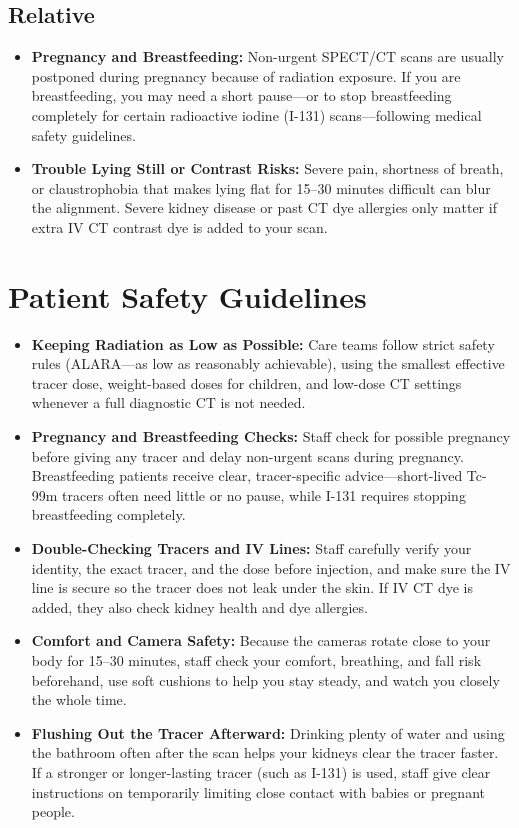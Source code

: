 \subsection{Relative}
\begin{itemize}
    \item \textbf{Pregnancy and Breastfeeding:} Non-urgent SPECT/CT scans are usually postponed during pregnancy because of radiation exposure. If you are breastfeeding, you may need a short pause---or to stop breastfeeding completely for certain radioactive iodine (I-131) scans---following medical safety guidelines.
    \item \textbf{Trouble Lying Still or Contrast Risks:} Severe pain, shortness of breath, or claustrophobia that makes lying flat for 15--30 minutes difficult can blur the alignment. Severe kidney disease or past CT dye allergies only matter if extra IV CT contrast dye is added to your scan.
\end{itemize}

\section{Patient Safety Guidelines}
\begin{itemize}
    \item \textbf{Keeping Radiation as Low as Possible:} Care teams follow strict safety rules (ALARA---as low as reasonably achievable), using the smallest effective tracer dose, weight-based doses for children, and low-dose CT settings whenever a full diagnostic CT is not needed.
    \item \textbf{Pregnancy and Breastfeeding Checks:} Staff check for possible pregnancy before giving any tracer and delay non-urgent scans during pregnancy. Breastfeeding patients receive clear, tracer-specific advice---short-lived Tc-99m tracers often need little or no pause, while I-131 requires stopping breastfeeding completely.
    \item \textbf{Double-Checking Tracers and IV Lines:} Staff carefully verify your identity, the exact tracer, and the dose before injection, and make sure the IV line is secure so the tracer does not leak under the skin. If IV CT dye is added, they also check kidney health and dye allergies.
    \item \textbf{Comfort and Camera Safety:} Because the cameras rotate close to your body for 15--30 minutes, staff check your comfort, breathing, and fall risk beforehand, use soft cushions to help you stay steady, and watch you closely the whole time.
    \item \textbf{Flushing Out the Tracer Afterward:} Drinking plenty of water and using the bathroom often after the scan helps your kidneys clear the tracer faster. If a stronger or longer-lasting tracer (such as I-131) is used, staff give clear instructions on temporarily limiting close contact with babies or pregnant people.
\end{itemize}

